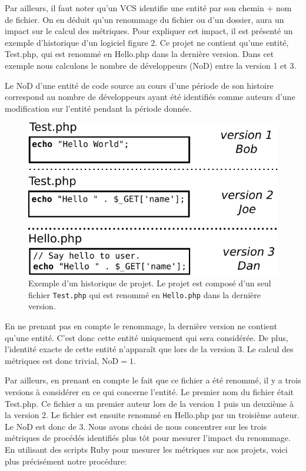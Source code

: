 Par ailleurs, il faut noter qu'un VCS identifie une entité par son chemin + nom de fichier. On en déduit qu'un renommage du fichier ou d'un dossier, aura un impact sur le calcul des métriques. Pour expliquer cet impact, il est présenté un exemple d'historique d'un logiciel figure 2. Ce projet ne contient qu'une entité, Test.php, qui est renommé en Hello.php dans la dernière version. Dans cet exemple nous calculons le nombre de développeurs (NoD) entre la version 1 et 3.

Le NoD d'une entité de code source au cours d'une période de son histoire correspond au nombre de développeurs ayant été identifiés comme auteurs d'une modification sur l'entité pendant la période donnée.\\

\begin{figure}[t]
	\centering
	\includegraphics[width=0.8\linewidth,keepaspectratio]{data/figures/example.pdf}
	\caption{Exemple d'un historique de projet. Le projet est composé d'un seul fichier \texttt{Test.php} qui est renommé en \texttt{Hello.php} dans la dernière version.}
	\label{fig:example}
\end{figure}
En ne prenant pas en compte le renommage, la dernière version ne contient qu'une entité. C'est donc cette entité uniquement qui sera considérée. De plus, l'identité exacte de cette entité n'apparaît que lors de la version 3. Le calcul des métriques est donc trivial, NoD$ = 1$.

Par ailleurs, en prenant en compte le fait que ce fichier a été renommé, il y a trois versions à considérer en ce qui concerne l'entité. Le premier nom du fichier était Test.php. Ce fichier a un premier auteur lors de la version 1 puis un deuxième à la version 2. Le fichier est ensuite renommé en Hello.php par un troisième auteur. Le NoD est donc de 3. Nous avons choisi de nous concentrer sur les trois métriques de procédés identifiés plus tôt pour mesurer l'impact du renommage. En utilisant des scripts Ruby pour mesurer les métriques sur nos projets, voici plus précisément notre procédure: 

